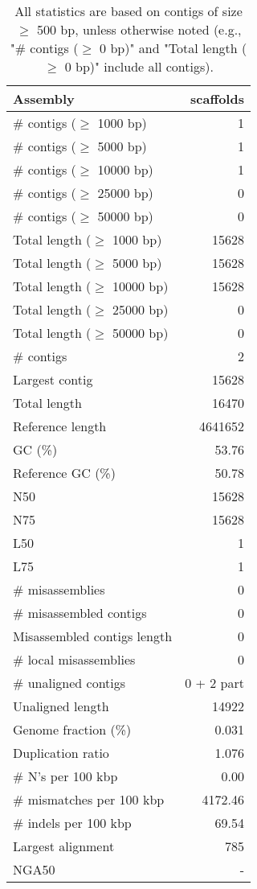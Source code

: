 \documentclass[12pt,a4paper]{article}
\begin{document}
\begin{table}[ht]
\begin{center}
\caption{All statistics are based on contigs of size $\geq$ 500 bp, unless otherwise noted (e.g., "\# contigs ($\geq$ 0 bp)" and "Total length ($\geq$ 0 bp)" include all contigs).}
\begin{tabular}{|l*{1}{|r}|}
\hline
Assembly & scaffolds \\ \hline
\# contigs ($\geq$ 1000 bp) & 1 \\ \hline
\# contigs ($\geq$ 5000 bp) & 1 \\ \hline
\# contigs ($\geq$ 10000 bp) & 1 \\ \hline
\# contigs ($\geq$ 25000 bp) & 0 \\ \hline
\# contigs ($\geq$ 50000 bp) & 0 \\ \hline
Total length ($\geq$ 1000 bp) & 15628 \\ \hline
Total length ($\geq$ 5000 bp) & 15628 \\ \hline
Total length ($\geq$ 10000 bp) & 15628 \\ \hline
Total length ($\geq$ 25000 bp) & 0 \\ \hline
Total length ($\geq$ 50000 bp) & 0 \\ \hline
\# contigs & 2 \\ \hline
Largest contig & 15628 \\ \hline
Total length & 16470 \\ \hline
Reference length & 4641652 \\ \hline
GC (\%) & 53.76 \\ \hline
Reference GC (\%) & 50.78 \\ \hline
N50 & 15628 \\ \hline
N75 & 15628 \\ \hline
L50 & 1 \\ \hline
L75 & 1 \\ \hline
\# misassemblies & 0 \\ \hline
\# misassembled contigs & 0 \\ \hline
Misassembled contigs length & 0 \\ \hline
\# local misassemblies & 0 \\ \hline
\# unaligned contigs & 0 + 2 part \\ \hline
Unaligned length & 14922 \\ \hline
Genome fraction (\%) & 0.031 \\ \hline
Duplication ratio & 1.076 \\ \hline
\# N's per 100 kbp & 0.00 \\ \hline
\# mismatches per 100 kbp & 4172.46 \\ \hline
\# indels per 100 kbp & 69.54 \\ \hline
Largest alignment & 785 \\ \hline
NGA50 & - \\ \hline
\end{tabular}
\end{center}
\end{table}
\end{document}
